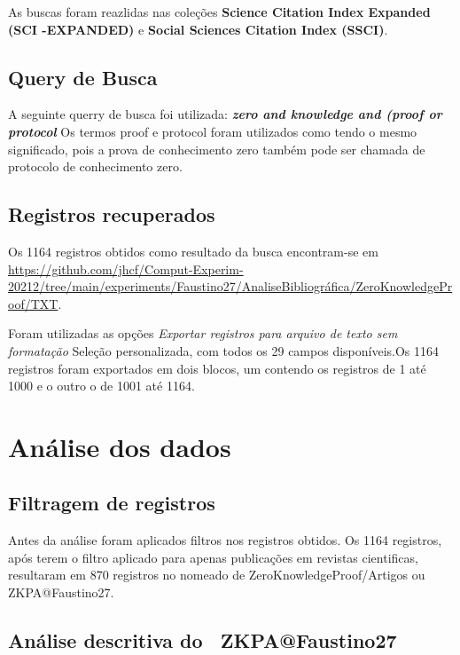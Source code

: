 As buscas foram reazlidas nas coleções \textbf{Science  Citation  Index  Expanded (SCI -EXPANDED)} e \textbf{Social  Sciences  Citation  Index (SSCI)}.

\subsection{Query de Busca}
A seguinte querry de busca foi utilizada:
\textit{\textbf{zero and knowledge and (proof or protocol}}
Os termos proof e protocol foram utilizados como tendo o mesmo significado, pois a prova de conhecimento zero também pode ser chamada de protocolo de conhecimento zero.

\subsection{Registros recuperados}

Os 1164 registros obtidos como resultado da busca encontram-se em \url{https://github.com/jhcf/Comput-Experim-20212/tree/main/experiments/Faustino27/AnaliseBibliográfica/ZeroKnowledgeProof/TXT}.

Foram utilizadas as opções \textit{Exportar registros para arquivo de texto sem formatação} Seleção personalizada, com todos os 29 campos disponíveis.Os 1164 registros foram exportados em dois blocos, um contendo os registros de 1 até 1000 e o outro o de 1001 até 1164.

\section{Análise dos dados}

\subsection{Filtragem de registros}

Antes da análise foram aplicados filtros nos registros obtidos. Os 1164 registros, após terem o filtro aplicado para apenas publicações em revistas cientificas, resultaram em 870 registros no \dataset nomeado de ZeroKnowledgeProof/Artigos ou ZKPA@Faustino27.

\subsection{Análise descritiva do \dataset\   ZKPA@Faustino27}

